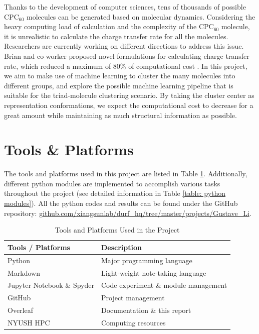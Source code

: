 \documentclass[a4paper]{article}
\begin{document}
Thanks to the development of computer sciences, tens of thousands of possible \(\text{CPC}_{60}\) molecules can be generated based on molecular dynamics. Considering the heavy computing load of calculation and the complexity of the \(\text{CPC}_{60}\) molecule, it is unrealistic to calculate the charge transfer rate for all the molecules. Researchers are currently working on different directions to address this issue. Brian and co-worker proposed novel formulations for calculating charge transfer rate, which reduced a maximum of 80\% of computational cost \cite{BrianDomi}. In this project, we aim to make use of machine learning to cluster the many molecules into different groups, and explore the possible machine learning pipeline that is suitable for the triad-molecule clustering scenario. By taking the cluster center as representation conformations, we expect the computational cost to decrease for a great amount while maintaining as much structural information as possible.

\section{Tools \& Platforms}

The tools and platforms used in this project are listed in Table \ref{table: tools & platforms}. Additionally, different python modules are implemented to accomplish various tasks throughout the project (see detailed information in Table \ref{table: python modules}). All the python codes and results can be found under the GitHub repository: \href{https://github.com/xiangsunlab/durf_hq/tree/master/projects/Gustave_Li}{github.com/xiangsunlab/durf\_hq/tree/master/projects/Gustave\_Li}.

\begin{table}[h!]
    \centering
    \caption{Tools and Platforms Used in the Project} 
    \begin{tabular}{l|l}
    \hline \hline
        \textbf{Tools / Platforms} & \textbf{Description} \\
        \hline
        Python & Major programming language \\
        Markdown & Light-weight note-taking language \\
        Jupyter Notebook \& Spyder & Code experiment \& module management \\
        GitHub & Project management \\
        Overleaf & Documentation \& this report \\
        NYUSH HPC & Computing resources \\
        \hline \hline
    \end{tabular}
    \label{table: tools & platforms}
\end{table}
\end{document}
